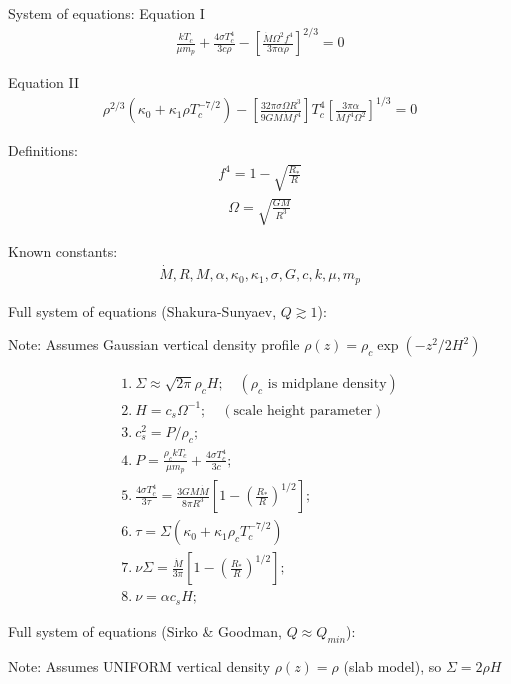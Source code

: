 
System of equations:
Equation I
\begin{align*}
\frac{k T_c}{\mu m_p} + \frac{4\sigma T_c^4}{3c\rho}-\left[\frac{\dot{M}\Omega^2f^4}{3\pi\alpha\rho}\right]^{2/3}=0
\end{align*}

Equation II
\begin{align*}
\rho^{2/3}(\kappa_0+\kappa_1\rho T_c^{-7/2})-\left[\frac{32\pi\sigma\Omega R^3}{9GM\dot{M}f^4}\right]T_c^4\left[\frac{3\pi\alpha}{\dot{M}f^4\Omega^2}\right]^{1/3}=0
\end{align*}

Definitions:
\begin{align*}
f^4=1-\sqrt{\frac{R_*}{R}}
\end{align*}
\begin{align*}
\Omega=\sqrt{\frac{GM}{R^3}}
\end{align*}

Known constants:
\begin{align*}
    \dot{M}, R, M, \alpha, \kappa_0, \kappa_1, \sigma, G, c, k, \mu, m_p
\end{align*}


Full system of equations (Shakura-Sunyaev, $Q\gtrsim 1$):

Note: Assumes Gaussian vertical density profile $\rho(z) = \rho_c \exp(-z^2/2H^2)$

\[
\begin{array}{l}
1.\ \Sigma \approx \sqrt{2\pi}\rho_c H; \quad (\text{$\rho_c$ is midplane density}) \\
2.\ H = c_s \Omega^{-1}; \quad (\text{scale height parameter}) \\
3.\ c_s^2 = P/\rho_c; \\
4.\ P = \frac{\rho_c k T_c}{\mu m_p} + \frac{4\sigma T_c^4}{3c}; \\
5.\ \frac{4\sigma T_c^4}{3\tau} = \frac{3GM\dot{M}}{8\pi R^3} \left[ 1 - \left(\frac{R_*}{R}\right)^{1/2} \right]; \\
6.\ \tau = \Sigma (\kappa_0 + \kappa_1 \rho_c T_c^{-7/2}) \\
7.\ \nu\Sigma = \frac{\dot{M}}{3\pi} \left[ 1 - \left(\frac{R_*}{R}\right)^{1/2} \right]; \\
8.\ \nu = \alpha c_s H;
\end{array}
\]

Full system of equations (Sirko \& Goodman, $Q \approx Q_{min}$):

Note: Assumes UNIFORM vertical density $\rho(z) = \rho$ (slab model), so $\Sigma = 2\rho H$

